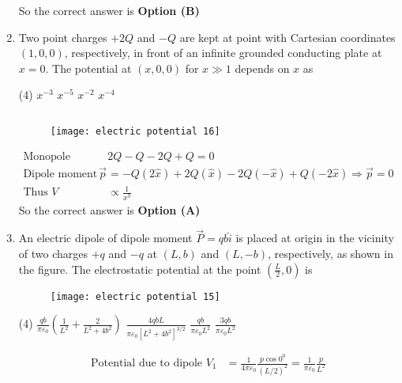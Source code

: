 \begin{enumerate}
\begin{answer}
		So the correct answer is \textbf{Option (B)}
	\end{answer}
	\item  Two point charges $+2 Q$ and $-Q$ are kept at point with Cartesian coordinates $(1,0,0)$, respectively, in front of an infinite grounded conducting plate at $x=0$. The potential at $(x, 0,0)$ for $x \gg 1$ depends on $x$ as
	{}
	\begin{tasks}(4)
		\task[\textbf{A.}] $x^{-3}$
		\task[\textbf{B.}]  $x^{-5}$
		\task[\textbf{C.}] $x^{-2}$
		\task[\textbf{D.}] $x^{-4}$
	\end{tasks}
	\begin{answer}$\left. \right. $
		\begin{figure}[H]
			\centering
			\texttt{[image: electric potential 16]}
		\end{figure}
		\begin{align*}
		\text{Monopole moment }&2 Q-Q-2 Q+Q=0\\
		\text{Dipole moment }\vec{p}&=-Q(2 \hat{x})+2 Q(\hat{x})-2 Q(-\hat{x})+Q(-2 \hat{x}) \Rightarrow \vec{p}=0\\
		\text{Thus }V &\propto \frac{1}{x^{3}}
		\end{align*}
		So the correct answer is \textbf{Option (A)}
	\end{answer}
	\item An electric dipole of dipole moment $\vec{P}=q b \hat{i}$ is placed at origin in the vicinity of two charges $+q$ and $-q$ at $(L, b)$ and $(L,-b)$, respectively, as shown in the figure. The electrostatic potential at the point $\left(\frac{L}{2}, 0\right)$ is
	{}
	\begin{figure}[H]
		\centering
		\texttt{[image: electric potential 15]}
	\end{figure}
	\begin{tasks}(4)
		\task[\textbf{A.}] $\frac{q b}{\pi \varepsilon_{0}}\left(\frac{1}{L^{2}}+\frac{2}{L^{2}+4 b^{2}}\right)$
		\task[\textbf{B.}] $\frac{4 q b L}{\pi \varepsilon_{0}\left[L^{2}+4 b^{2}\right]^{3 / 2}}$
		\task[\textbf{C.}] $\frac{q b}{\pi \varepsilon_{0} L^{2}}$
		\task[\textbf{D.}] $\frac{3 q b}{\pi \varepsilon_{0} L^{2}}$
	\end{tasks}
	\begin{answer}
		\begin{align*}
		\text{Potential due to dipole }V_{1}&=\frac{1}{4 \pi \varepsilon_{0}} \frac{p \cos 0^{0}}{(L / 2)^{2}}=\frac{1}{\pi \varepsilon_{0}} \frac{p}{L^{2}}\\

\end{align*}
\end{answer}
\end{enumerate}
